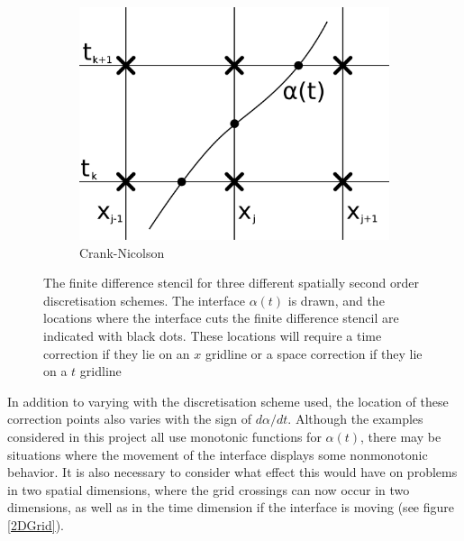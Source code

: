 \begin{figure}[h]
\begin{subfigure}[b]{0.3\textwidth}
        \includegraphics[width=\textwidth]{diagrams/GridCN}
        \caption{Crank-Nicolson}
        \label{fig:CNGrid}
    \end{subfigure}
    \caption{The finite difference stencil for three different spatially second order discretisation schemes.
    The interface $\alpha(t)$ is drawn, and the locations where the interface cuts the finite difference stencil are indicated with black dots.
    These locations will require a time correction if they lie on an $x$ gridline or a space correction if they lie on a $t$ gridline}
    \label{fig:GridCrossing}
\end{figure}

In addition to varying with the discretisation scheme used, the location of these correction points also varies with the sign of $d \alpha / dt$.
Although the examples considered in this project all use monotonic functions for $\alpha(t)$, there may be situations where the movement of the interface displays some nonmonotonic behavior.
It is also necessary to consider what effect this would have on problems in two spatial dimensions, where the grid crossings can now occur in two dimensions, as well as in the time dimension if the interface is moving (see figure \ref{2DGrid}).

